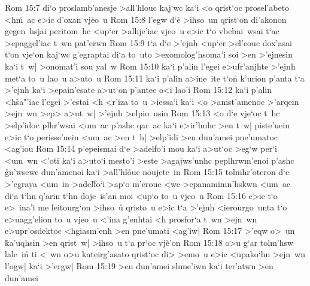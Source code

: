 \vs Rom 15:7
di`o
proslamb'anesje
>all'hlouc
kaj`wc
ka`i
<o
qrist`oc
prosel'abeto
<h\r{m}~ac
e>ic
d'oxan
vj\r{e}o~u\bibvsend
{}
\vs Rom 15:8
l'egw
d`e\r{}
>ihso~un
qrist`on
di'akonon
gegen~hsjai
peritom~hc
<up`er
>alhje'iac
vjeo~u
e>ic
t`o
vbebai~wsai
t`ac
>epaggel'iac
t~wn
pat'erwn\bibvsend
\vs Rom 15:9
t`a
d`e
>'ejnh
<up`er
>el'eouc
dox'asai
t`on
vje`on
kaj`wc
g'egraptai
di`a
to~uto
>exomolog'hsoma'i
soi
>en
>'ejnesin
ka`i
t~w|
>onomat'i
sou
yal~w\bibvsend
\vs Rom 15:10
ka`i
p'alin
l'egei
e>ufr'anjhte
>'ejnh
met`a
to~u
lao~u
a>uto~u\bibvsend
\vs Rom 15:11
ka`i
p'alin
a>ine~ite
t`on\r{}
k'urion
p'anta
t`a
>'ejnh
ka`i
>epain'esate
a>ut`on
p'antec
o<i
lao'i\bibvsend
\vs Rom 15:12
ka`i
p'alin
<h\r{s}a"'iac
l'egei
>'estai
<h
<r'iza
to~u
>iessa`i
ka`i
<o
>anist'amenoc
>'arqein
>ejn~wn
>ep>
a>ut~w|
>'ejnh
>elpio~usin\bibvsend
\vs Rom 15:13
<o
d`e
vje`oc
t~hc
>elp'idoc
plhr'wsai
<um~ac
p'ashc
qar~ac
ka`i
e>ir'hnhc
>en
t~w|
piste'uein
e>ic
t`o
perisse'uein
<um~ac
>en
t~h|
>elp'idi
>en
dun'amei
pne'umatoc
<ag'iou\bibvsend
\vs Rom 15:14
p'epeismai
d`e
>adelfo'i
mou
ka`i
a>ut`oc
>eg`w
per`i
<um~wn
<'oti
ka`i
a>uto`i
mesto'i
>este
>agajws'unhc
peplhrwm'enoi
p'ashc
\r{g}n'wsewc
dun'amenoi
ka`i
>all'hl\r{o}uc
noujete~in\bibvsend
\vs Rom 15:15
tolmhr'oteron
d`e
>'egraya
<um~in
>adel\r{f}o`i
>ap`o
m'erouc
<wc
>epanamimn'hskwn
<um~ac
di`a
t`hn
q'arin
t`hn
doje~is'an
moi
<up`o
to~u
vjeo~u\bibvsend
\vs Rom 15:16
e>ic
t`o
e>~ina'i
me
leitourg`on
>ihso~u\r{}
qristo~u
e>ic
t`a
>'ejnh
<ierourgo~unta
t`o
e>uagg'elion
to~u
vjeo~u
<'ina
g'enhtai
<h
prosfor`a
t~wn
>ejn~wn
e>upr'osdektoc
<hgiasm'enh
>en
pne'umati
<ag'iw|\bibvsend
\vs Rom 15:17
>'eqw
o>~un
\r{k}a'uqhsin
>en
qrist~w|
>ihso~u
t`a
pr`oc
vj\r{e}'on\bibvsend
{}
\vs Rom 15:18
o>u
g`ar
tolm'hsw
lale~in\r{}
ti
<~wn
o>u
kateirg'asato
qrist`oc
di>
>emo~u
e>ic
<upako`hn
>ejn~wn
l'ogw|
ka`i
>'ergw|\bibvsend
\vs Rom 15:19
>en
dun'amei
shme'iwn
ka`i
ter'atwn
>en
dun'amei
